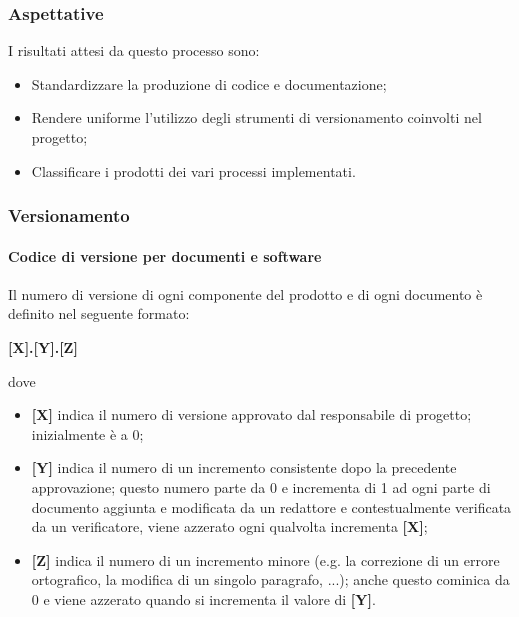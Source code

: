 \subsubsection{Aspettative}
I risultati attesi da questo processo sono:
\begin{itemize}
    \item Standardizzare la produzione di codice e documentazione;
    \item Rendere uniforme l'utilizzo degli strumenti di versionamento coinvolti nel progetto;
    \item Classificare i prodotti dei vari processi implementati.
\end{itemize}

\subsubsection{Versionamento}
\paragraph{Codice di versione per documenti e software}
Il numero di versione di ogni componente del prodotto e di ogni documento è definito nel seguente formato:
\begin{center}
    \textbf{[X].[Y].[Z]}
\end{center}
dove
\begin{itemize}
    \item \textbf{[X]} indica il numero di versione approvato dal responsabile di progetto; inizialmente è a 0;
    \item \textbf{[Y]} indica il numero di un incremento consistente dopo la precedente approvazione; questo numero parte da
                       0 e incrementa di 1 ad ogni parte di documento aggiunta e modificata da un redattore e contestualmente verificata da un verificatore,
                       viene azzerato ogni qualvolta incrementa \textbf{[X]};
    \item \textbf{[Z]} indica il numero di un incremento minore (e.g. la correzione di un errore ortografico, la modifica di un singolo paragrafo, ...);
                       anche questo cominica da 0 e viene azzerato quando si incrementa il valore di \textbf{[Y]}.
\end{itemize}

